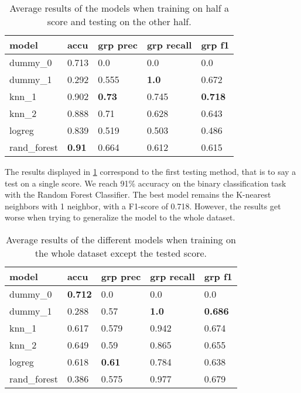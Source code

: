 \documentclass{article}
\begin{document}
\begin{table}[ht]
  \begin{center}
    \begin{tabular}{l|llll}
    model        & accu          & grp prec      & grp recall   & grp f1         \\ \hline
    dummy\_0     & 0.713         & 0.0           & 0.0          & 0.0            \\ \hline
    dummy\_1     & 0.292         & 0.555         & \textbf{1.0} & 0.672          \\ \hline
    knn\_1       & 0.902         & \textbf{0.73} & 0.745        & \textbf{0.718} \\ \hline
    knn\_2       & 0.888         & 0.71          & 0.628        & 0.643          \\ \hline
    logreg       & 0.839         & 0.519         & 0.503        & 0.486          \\ \hline
    rand\_forest & \textbf{0.91} & 0.664         & 0.612        & 0.615          \\ \hline
    \end{tabular}
  \end{center}
  \caption{Average results of the models when training on half a score and testing on the other half.}
  \label{tab:results_toht}
\end{table}


The results displayed in \ref{tab:results_toht} correspond to the first testing method, that is to say a test on a single score.
We reach 91\% accuracy on the binary classification task with the Random Forest Classifier. The best model remains the K-nearest neighbors with 1 neighbor, with a F1-score of 0.718.
However, the results get worse when trying to generalize the model to the whole dataset.


\begin{table}[ht]
  \begin{center}
    \begin{tabular}{l|llll}
    model        & accu           & grp prec      & grp recall   & grp f1         \\ \hline
    dummy\_0     & \textbf{0.712} & 0.0           & 0.0          & 0.0            \\ \hline
    dummy\_1     & 0.288          & 0.57          & \textbf{1.0} & \textbf{0.686} \\ \hline
    knn\_1       & 0.617          & 0.579         & 0.942        & 0.674          \\ \hline
    knn\_2       & 0.649          & 0.59          & 0.865        & 0.655          \\ \hline
    logreg       & 0.618          & \textbf{0.61} & 0.784        & 0.638          \\ \hline
    rand\_forest & 0.386          & 0.575         & 0.977        & 0.679          \\ \hline
    \end{tabular}
  \end{center}
  \caption{Average results of the different models when training on the whole dataset except the tested score.}
  \label{tab:results_toaet}
\end{table}
\end{document}
